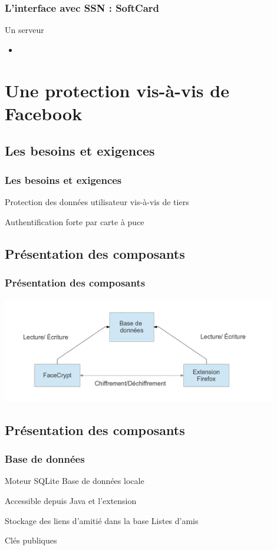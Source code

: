 \documentclass{beamer}
\begin{document}
\begin{frame}
    \frametitle{L'interface avec SSN : SoftCard}
    \begin{block}{Un serveur}
        \begin{itemize}
            \item 
        \end{itemize}
    \end{block}
\end{frame}

\section{Une protection vis-à-vis de Facebook}

\subsection{Les besoins et exigences}
\begin{frame}
    \frametitle{Les besoins et exigences}
    \begin{block}{}

Protection des données utilisateur vis-à-vis de tiers

Authentification forte par carte à puce 
    \end{block}
\end{frame}

\subsection{Présentation des composants}
\begin{frame}
    \frametitle{Présentation des composants}
 \includegraphics[width=12cm]{schema_zako}
\end{frame}


\subsection{Présentation des composants}
\begin{frame}
    \frametitle{Base de données}
    \begin{block}{Moteur SQLite }
 Base de données locale

Accessible depuis Java et l'extension 
    \end{block}
  \begin{block}{Stockage des liens d'amitié dans la base}
Listes d'amis


Clés publiques


    \end{block}
\end{frame}
\end{document}
